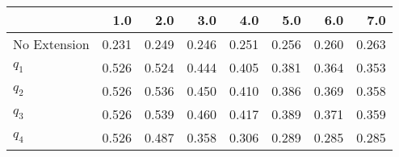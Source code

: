 \begin{tabular}{lrrrrrrr}
\toprule
{} &   1.0 &   2.0 &   3.0 &   4.0 &   5.0 &   6.0 &   7.0 \\
\midrule
No Extension & 0.231 & 0.249 & 0.246 & 0.251 & 0.256 & 0.260 & 0.263 \\
$q_1$        & 0.526 & 0.524 & 0.444 & 0.405 & 0.381 & 0.364 & 0.353 \\
$q_2$        & 0.526 & 0.536 & 0.450 & 0.410 & 0.386 & 0.369 & 0.358 \\
$q_3$        & 0.526 & 0.539 & 0.460 & 0.417 & 0.389 & 0.371 & 0.359 \\
$q_4$        & 0.526 & 0.487 & 0.358 & 0.306 & 0.289 & 0.285 & 0.285 \\
\bottomrule
\end{tabular}
